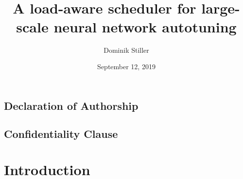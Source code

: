 \title{A load-aware scheduler for large-scale neural network autotuning}
\author{Dominik Stiller}
\date{September 12, 2019}



\makeglossaries




	\pagestyle{empty}
	\makeatletter
	\begin{titlepage}
		
	\end{titlepage}
	
	\section*{Declaration of Authorship}
	
	\makeatother
	\vfill
	
	\section*{Confidentiality Clause}
	
	\vfill

	\begin{abstract}
		
	\end{abstract}

	\setlength{\cftbeforetoctitleskip}{2.1em}
	\begin{spacing}{1.15}
	   \tableofcontents
	\end{spacing}
	\clearpage
	\thispagestyle{empty}
	
	\pagestyle{plain}
	
	\printacronyms
	\clearpage
	
	\listoffigures
	\clearpage
	\listoftables
	\renewcommand\listoflistingscaption{List of Source Codes}
	\listoflistings
	\clearpage
	
	
	\pagestyle{headings}
	
	\chapter{Introduction}
	
